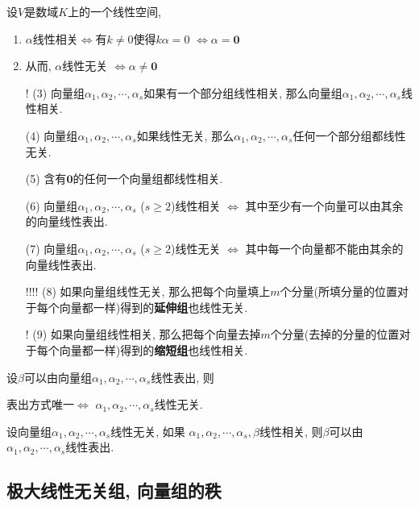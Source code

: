 \begin{Note}
设$V$是数域$K$上的一个线性空间, 
\begin{enumerate}[(1)]
\item $\alpha$线性相关$\Leftrightarrow$有$k \neq 0$使得$k \alpha = 0$ 
$\Leftrightarrow \alpha = \mathbf{0}$
\item 从而, $\alpha$线性无关 $\Leftrightarrow \alpha \neq \mathbf{0}$
\item[! (3)] 向量组$\alpha_1, \alpha_2, \cdots, \alpha_s$如果有一个部分组线性相关, 那么向量组$\alpha_1, \alpha_2, \cdots, \alpha_s$线性相关.
\item[(4)] 向量组$\alpha_1, \alpha_2, \cdots, \alpha_s$如果线性无关, 那么$\alpha_1, \alpha_2, \cdots, \alpha_s$任何一个部分组都线性无关.
\item[(5)] 含有$\mathbf{0}$的任何一个向量组都线性相关.
\item[(6)] 向量组$\alpha_1, \alpha_2, \cdots, \alpha_s$ ($s \ge 2$)线性相关 $\Leftrightarrow$ 其中至少有一个向量可以由其余的向量线性表出.
\item[(7)] 向量组$\alpha_1, \alpha_2, \cdots, \alpha_s$ ($s \ge 2$)线性无关 $\Leftrightarrow$ 其中每一个向量都不能由其余的向量线性表出.
\item[!!!! (8)] 如果向量组线性无关, 那么把每个向量填上$m$个分量(所填分量的位置对于每个向量都一样)得到的\textbf{延伸组}也线性无关.
\item[! (9)] 如果向量组线性相关, 那么把每个向量去掉$m$个分量(去掉的分量的位置对于每个向量都一样)得到的\textbf{缩短组}也线性相关.
\end{enumerate}
\end{Note}

\begin{Proposition}[!!]
设$\beta$可以由向量组$\alpha_1, \alpha_2, \cdots, \alpha_s$线性表出, 则
\begin{tightcenter}
表出方式唯一$\Leftrightarrow$
$\alpha_1, \alpha_2, \cdots, \alpha_s$线性无关. 
\end{tightcenter}
\end{Proposition}

\begin{Proposition}[!!!]
设向量组$\alpha_1, \alpha_2, \cdots, \alpha_s$线性无关, 如果
$\alpha_1, \alpha_2, \cdots, \alpha_s, \beta$线性相关, 则$\beta$可以由$\alpha_1, \alpha_2, \cdots, \alpha_s$线性表出.
\end{Proposition}

\subsection{极大线性无关组, 向量组的秩}

